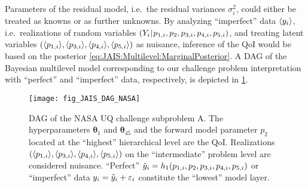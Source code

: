 Parameters of the residual model, i.e.\ the residual variances \(\sigma_i^2\), could either be treated as knowns or as further unknowns.
By analyzing ``imperfect'' data \(\langle{y_i}\rangle\), i.e.\ realizations of random variables \((Y_i {\:\!}|{\:\!} p_{1,i},p_2,p_{3,i},p_{4,i},p_{5,i})\),
and treating latent variables \((\langle{p_{1,i}}\rangle,\langle{p_{3,i}}\rangle,\langle{p_{4,i}}\rangle,\langle{p_{5,i}}\rangle)\) as nuisance,
inference of the QoI would be based on the posterior \cref{eq:JAIS:Multilevel:MarginalPosterior}.
A DAG of the Bayesian multilevel model corresponding to our challenge problem interpretation with ``perfect'' and ``imperfect'' data, respectively, is depicted in \cref{fig:JAIS:NASA:DAG}.
\begin{figure}[htbp]
  \centering
  \texttt{[image: fig\_JAIS\_DAG\_NASA]}
  \caption[DAG of the NASA UQ challenge subproblem A]{DAG of the NASA UQ challenge subproblem A.
           The hyperparameters \(\bm{\theta}_1\) and \(\bm{\theta}_{45}\) and the forward model parameter \(p_2\) located at the ``highest'' hierarchical level are the QoI.
           Realizations \((\langle{p_{1,i}}\rangle,\langle{p_{3,i}}\rangle,\langle{p_{4,i}}\rangle,\langle{p_{5,i}}\rangle)\) on the ``intermediate'' problem level are considered nuisance.
           ``Perfect'' \(\tilde{y}_i = h_1(p_{1,i},p_2,p_{3,i},p_{4,i},p_{5,i})\) or ``imperfect'' data \(y_i = \tilde{y}_i + \varepsilon_i\) constitute the ``lowest'' model layer.
          }
  \label{fig:JAIS:NASA:DAG}
\end{figure}